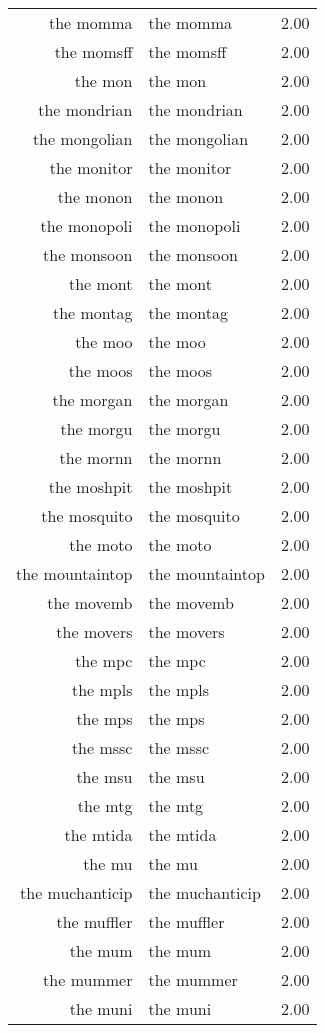 \begin{table}[ht]
\begin{tabular}{rlr}
  the momma & the momma & 2.00 \\ 
  the momsff & the momsff & 2.00 \\ 
  the mon & the mon & 2.00 \\ 
  the mondrian & the mondrian & 2.00 \\ 
  the mongolian & the mongolian & 2.00 \\ 
  the monitor & the monitor & 2.00 \\ 
  the monon & the monon & 2.00 \\ 
  the monopoli & the monopoli & 2.00 \\ 
  the monsoon & the monsoon & 2.00 \\ 
  the mont & the mont & 2.00 \\ 
  the montag & the montag & 2.00 \\ 
  the moo & the moo & 2.00 \\ 
  the moos & the moos & 2.00 \\ 
  the morgan & the morgan & 2.00 \\ 
  the morgu & the morgu & 2.00 \\ 
  the mornn & the mornn & 2.00 \\ 
  the moshpit & the moshpit & 2.00 \\ 
  the mosquito & the mosquito & 2.00 \\ 
  the moto & the moto & 2.00 \\ 
  the mountaintop & the mountaintop & 2.00 \\ 
  the movemb & the movemb & 2.00 \\ 
  the movers & the movers & 2.00 \\ 
  the mpc & the mpc & 2.00 \\ 
  the mpls & the mpls & 2.00 \\ 
  the mps & the mps & 2.00 \\ 
  the mssc & the mssc & 2.00 \\ 
  the msu & the msu & 2.00 \\ 
  the mtg & the mtg & 2.00 \\ 
  the mtida & the mtida & 2.00 \\ 
  the mu & the mu & 2.00 \\ 
  the muchanticip & the muchanticip & 2.00 \\ 
  the muffler & the muffler & 2.00 \\ 
  the mum & the mum & 2.00 \\ 
  the mummer & the mummer & 2.00 \\ 
  the muni & the muni & 2.00 \\ 

\end{tabular}
\end{table}

